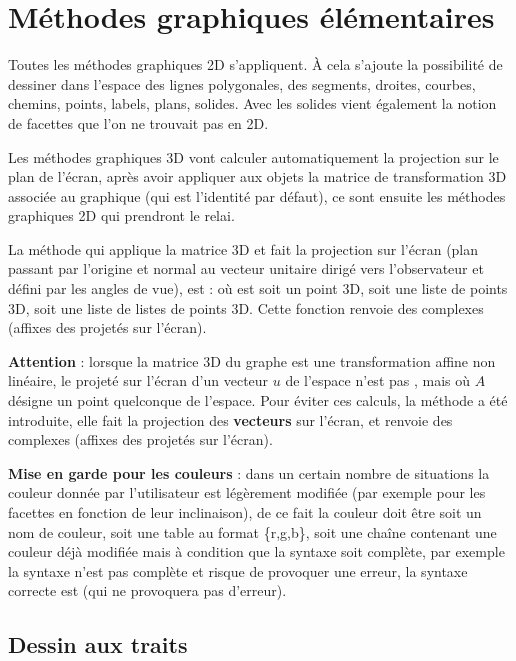 \section{Méthodes graphiques élémentaires}

Toutes les méthodes graphiques 2D s'appliquent. À cela s'ajoute la possibilité de dessiner dans l'espace des lignes polygonales, des segments, droites, courbes, chemins, points, labels, plans, solides. Avec les solides vient également la notion de facettes que l'on ne trouvait pas en 2D.

Les méthodes graphiques 3D vont calculer automatiquement la projection sur le plan de l'écran, après avoir appliquer aux objets la matrice de transformation 3D associée au graphique (qui est l'identité par défaut), ce sont ensuite les méthodes graphiques 2D qui prendront le relai.

La méthode qui applique la matrice 3D et fait la projection sur l'écran (plan passant par l'origine et normal au vecteur unitaire dirigé vers l'observateur et défini par les angles de vue), est :  où  est soit un point 3D, soit une liste de points 3D, soit une liste de listes de points 3D. Cette fonction renvoie des complexes (affixes des projetés sur l'écran).

\textbf{Attention} : lorsque la matrice 3D du graphe est une transformation affine non linéaire, le projeté sur l'écran d'un vecteur $u$ de l'espace n'est pas , mais  où $A$ désigne un point quelconque de l'espace. Pour éviter ces calculs, la méthode  a été  introduite, elle fait la projection des \textbf{vecteurs} sur l'écran, et renvoie des complexes (affixes des projetés sur l'écran).

\textbf{Mise en garde pour les couleurs} : dans un certain nombre de situations la couleur donnée par l'utilisateur est légèrement modifiée (par exemple pour les facettes en fonction de leur inclinaison), de ce fait la couleur doit être soit un nom de couleur, soit une table au format \{r,g,b\}, soit une chaîne contenant une couleur déjà modifiée mais à condition que la syntaxe soit complète, par exemple la syntaxe  n'est pas complète et risque de provoquer une erreur, la syntaxe correcte est  (qui ne provoquera pas d'erreur).

\subsection{Dessin aux traits}


